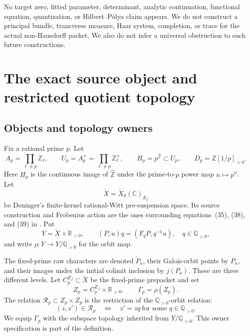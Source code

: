\documentclass[11pt]{article}
\theoremstyle{definition}
\newcommand{\C}{\mathbb{C}}
\newcommand{\Q}{\mathbb{Q}}
\newcommand{\R}{\mathbb{R}}
\newcommand{\Z}{\mathbb{Z}}
\newcommand{\Zhat}{\widehat{\mathbb Z}}
\newcommand{\Rp}{\mathcal R_p}
\begin{document}
No target zero, fitted parameter, determinant, analytic continuation, functional equation, quantization, or Hilbert--Pólya claim appears.  We do not construct a principal bundle, transverse measure, Haar system, completion, or trace for the actual non-Hausdorff packet.  We also do not infer a universal obstruction to such future constructions.

\section{The exact source object and restricted quotient topology}\label{sec:source}

\subsection{Objects and topology owners}

Fix a rational prime \(p\).  Let
\[
 A_p=\prod_{\ell\ne p}\Z_\ell,\qquad
 U_p=A_p^\times=\prod_{\ell\ne p}\Z_\ell^\times,
 \qquad H_p=p^{\Zhat}\subset U_p,
 \qquad D_p=\Z[1/p]_{>0}.
\]
Here \(H_p\) is the continuous image of \(\Zhat\) under the prime-to-\(p\) power map \(n\mapsto p^n\).  Let
\[
 \check X=\check X_0(\C)_{E_f}
\]
be Deninger's finite-kernel rational-Witt pre-suspension space.  Its source construction and Frobenius action are the ones surrounding equations~(35), (38), and (39) in \cite[physical pp.~32--33]{Deninger2026}.  Put
\[
 Y=\check X\times\R_{>0},
 \qquad (P,u)q=(F_qP,q^{-1}u),\quad q\in\Q_{>0},
\]
and write \(\rho:Y\to Y/\Q_{>0}\) for the orbit map.

The fixed-prime raw characters are denoted \(\widetilde P_a\), their Galois-orbit points by \(P_a\), and their images under the initial colimit inclusion by \(j(P_a)\).  These are three different levels.  Let \(C_p^{E_f}\subset\check X\) be the fixed-prime prepacket and set
\[
 Z_p=C_p^{E_f}\times\R_{>0},\qquad
 \Gamma_p=\rho(Z_p).
\]
The relation \(\Rp\subset Z_p\times Z_p\) is the restriction of the \(\Q_{>0}\)-orbit relation:
\[
 (z,z')\in\Rp\quad\Longleftrightarrow\quad
 z'=zq\ \text{for some }q\in\Q_{>0}.
\]
We equip \(\Gamma_p\) with the subspace topology inherited from \(Y/\Q_{>0}\).  This owner specification is part of the definition.
\end{document}

